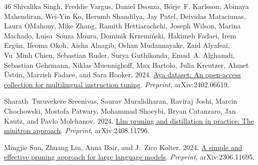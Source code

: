 \documentclass[11pt]{article}
\begin{document}
\begin{thebibliography}{46}
Shivalika Singh, Freddie Vargus, Daniel Dsouza, Börje~F. Karlsson, Abinaya Mahendiran, Wei-Yin Ko, Herumb Shandilya, Jay Patel, Deividas Mataciunas, Laura OMahony, Mike Zhang, Ramith Hettiarachchi, Joseph Wilson, Marina Machado, Luisa~Souza Moura, Dominik Krzemiński, Hakimeh Fadaei, Irem Ergün, Ifeoma Okoh, Aisha Alaagib, Oshan Mudannayake, Zaid Alyafeai, Vu~Minh Chien, Sebastian Ruder, Surya Guthikonda, Emad~A. Alghamdi, Sebastian Gehrmann, Niklas Muennighoff, Max Bartolo, Julia Kreutzer, Ahmet Üstün, Marzieh Fadaee, and Sara Hooker. 2024.
\newblock \href {https://arxiv.org/abs/2402.06619} {Aya dataset: An open-access collection for multilingual instruction tuning}.
\newblock \emph{Preprint}, arXiv:2402.06619.

Sharath~Turuvekere Sreenivas, Saurav Muralidharan, Raviraj Joshi, Marcin Chochowski, Mostofa Patwary, Mohammad Shoeybi, Bryan Catanzaro, Jan Kautz, and Pavlo Molchanov. 2024.
\newblock \href {https://arxiv.org/abs/2408.11796} {Llm pruning and distillation in practice: The minitron approach}.
\newblock \emph{Preprint}, arXiv:2408.11796.

Mingjie Sun, Zhuang Liu, Anna Bair, and J.~Zico Kolter. 2024.
\newblock \href {https://arxiv.org/abs/2306.11695} {A simple and effective pruning approach for large language models}.
\newblock \emph{Preprint}, arXiv:2306.11695.


\end{thebibliography}
\end{document}

